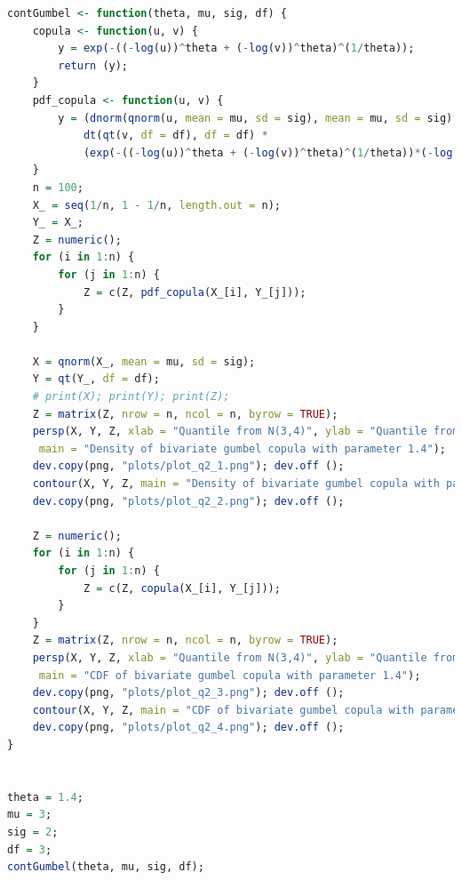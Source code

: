 \documentclass{article}
\begin{document}

\begin{lstlisting}[language=R]
contGumbel <- function(theta, mu, sig, df) {
	copula <- function(u, v) {
		y = exp(-((-log(u))^theta + (-log(v))^theta)^(1/theta));
		return (y);
	}
	pdf_copula <- function(u, v) {
		y = (dnorm(qnorm(u, mean = mu, sd = sig), mean = mu, sd = sig) * 
			dt(qt(v, df = df), df = df) *
			(exp(-((-log(u))^theta + (-log(v))^theta)^(1/theta))*(-log(u))^(theta - 1)*(-log(v))^(theta - 1)*((-log(u))^theta + (-log(v))^theta)^(2/theta - 2))/(u*v) - (theta*exp(-((-log(u))^theta + (-log(v))^theta)^(1/theta))*(-log(u))^(theta - 1)*(-log(v))^(theta - 1)*(1/theta - 1)*((-log(u))^theta + (-log(v))^theta)^(1/theta - 2))/(u*v));
	}
	n = 100;
	X_ = seq(1/n, 1 - 1/n, length.out = n);
	Y_ = X_;
	Z = numeric();
	for (i in 1:n) {
		for (j in 1:n) {
			Z = c(Z, pdf_copula(X_[i], Y_[j]));
		}
	}

	X = qnorm(X_, mean = mu, sd = sig);
	Y = qt(Y_, df = df);
	# print(X); print(Y); print(Z);
	Z = matrix(Z, nrow = n, ncol = n, byrow = TRUE);
	persp(X, Y, Z, xlab = "Quantile from N(3,4)", ylab = "Quantile from T(3)", zlab = "Density",
	 main = "Density of bivariate gumbel copula with parameter 1.4");
	dev.copy(png, "plots/plot_q2_1.png"); dev.off ();
	contour(X, Y, Z, main = "Density of bivariate gumbel copula with parameter 1.4");
	dev.copy(png, "plots/plot_q2_2.png"); dev.off ();

	Z = numeric();
	for (i in 1:n) {
		for (j in 1:n) {
			Z = c(Z, copula(X_[i], Y_[j]));
		}
	}
	Z = matrix(Z, nrow = n, ncol = n, byrow = TRUE);
	persp(X, Y, Z, xlab = "Quantile from N(3,4)", ylab = "Quantile from T(3)", zlab = "CDF",
	 main = "CDF of bivariate gumbel copula with parameter 1.4");
	dev.copy(png, "plots/plot_q2_3.png"); dev.off ();
	contour(X, Y, Z, main = "CDF of bivariate gumbel copula with parameter 1.4");
	dev.copy(png, "plots/plot_q2_4.png"); dev.off ();
}


theta = 1.4;
mu = 3;
sig = 2;
df = 3;
contGumbel(theta, mu, sig, df);
\end{lstlisting}
\end{document}
